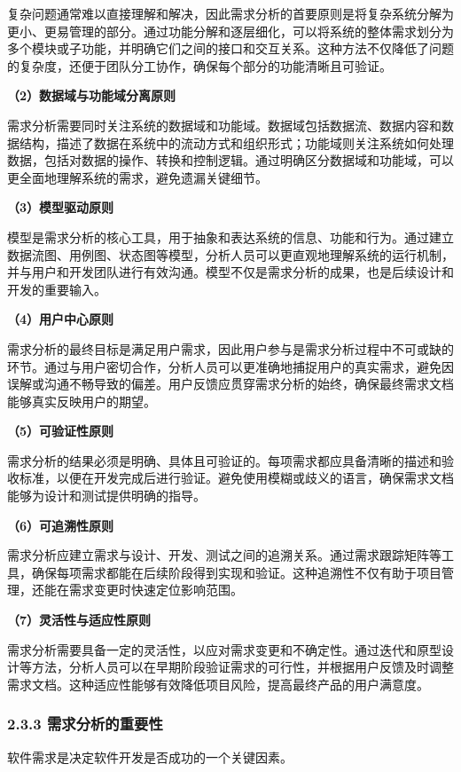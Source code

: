 复杂问题通常难以直接理解和解决，因此需求分析的首要原则是将复杂系统分解为更小、更易管理的部分。通过功能分解和逐层细化，可以将系统的整体需求划分为多个模块或子功能，并明确它们之间的接口和交互关系。这种方法不仅降低了问题的复杂度，还便于团队分工协作，确保每个部分的功能清晰且可验证。

\textbf{（2）数据域与功能域分离原则}

需求分析需要同时关注系统的数据域和功能域。数据域包括数据流、数据内容和数据结构，描述了数据在系统中的流动方式和组织形式；功能域则关注系统如何处理数据，包括对数据的操作、转换和控制逻辑。通过明确区分数据域和功能域，可以更全面地理解系统的需求，避免遗漏关键细节。

\textbf{（3）模型驱动原则}

模型是需求分析的核心工具，用于抽象和表达系统的信息、功能和行为。通过建立数据流图、用例图、状态图等模型，分析人员可以更直观地理解系统的运行机制，并与用户和开发团队进行有效沟通。模型不仅是需求分析的成果，也是后续设计和开发的重要输入。

\textbf{（4）用户中心原则}

需求分析的最终目标是满足用户需求，因此用户参与是需求分析过程中不可或缺的环节。通过与用户密切合作，分析人员可以更准确地捕捉用户的真实需求，避免因误解或沟通不畅导致的偏差。用户反馈应贯穿需求分析的始终，确保最终需求文档能够真实反映用户的期望。

\textbf{（5）可验证性原则}

需求分析的结果必须是明确、具体且可验证的。每项需求都应具备清晰的描述和验收标准，以便在开发完成后进行验证。避免使用模糊或歧义的语言，确保需求文档能够为设计和测试提供明确的指导。

\textbf{（6）可追溯性原则}

需求分析应建立需求与设计、开发、测试之间的追溯关系。通过需求跟踪矩阵等工具，确保每项需求都能在后续阶段得到实现和验证。这种追溯性不仅有助于项目管理，还能在需求变更时快速定位影响范围。

\textbf{（7）灵活性与适应性原则}

需求分析需要具备一定的灵活性，以应对需求变更和不确定性。通过迭代和原型设计等方法，分析人员可以在早期阶段验证需求的可行性，并根据用户反馈及时调整需求文档。这种适应性能够有效降低项目风险，提高最终产品的用户满意度。

\subsubsection{2.3.3 需求分析的重要性}\label{ux9700ux6c42ux5206ux6790ux7684ux91cdux8981ux6027}

软件需求是决定软件开发是否成功的一个关键因素。

